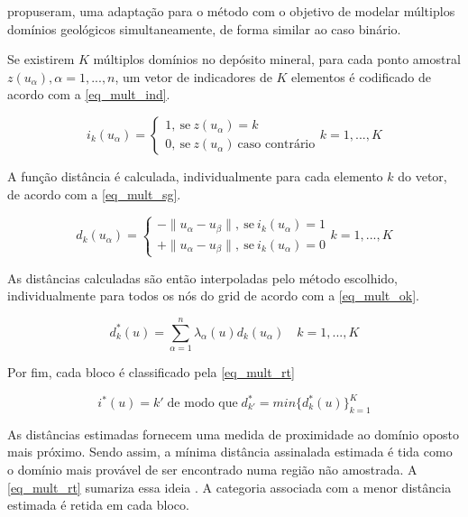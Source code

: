  propuseram, uma adaptação para o método com o objetivo de modelar múltiplos domínios geológicos simultaneamente, de forma similar ao caso binário.

Se existirem $K$ múltiplos domínios no depósito mineral, para cada ponto amostral ${z(u_\alpha),\alpha=1,...,n}$, um vetor de indicadores de $K$ elementos é codificado de acordo com a \autoref{eq_mult_ind}.

\begin{equation}
	i_k(u_\alpha)=\begin{cases}
	1,\:\textrm{se}\:z(u_\alpha)=k\\
    0,\:\textrm{se}\:z(u_\alpha)\:\textrm{caso contrário}\end{cases} k=1,...,K
    \label{eq_mult_ind}
\end{equation}

A função distância é calculada, individualmente para cada elemento $k$ do vetor, de acordo com a \autoref{eq_mult_sg}.

\begin{equation}
	d_k(u_\alpha)=\begin{cases}
	-\parallel u_\alpha-u_\beta\parallel,\:\textrm{se}\:i_k(u_\alpha)=1\\
	+\parallel u_\alpha-u_\beta\parallel,\:\textrm{se}\:i_k(u_\alpha)=0\end{cases} k=1,...,K
    \label{eq_mult_sg}
\end{equation}

As distâncias calculadas são então interpoladas pelo método escolhido, individualmente para todos os nós do grid de acordo com a \autoref{eq_mult_ok}.

\begin{equation}
	d_k^*(u)=\sum\limits_{\alpha=1}^n \lambda_\alpha(u)d_k(u_\alpha)\quad k=1,...,K
    \label{eq_mult_ok}
\end{equation}

Por fim, cada bloco é  classificado pela \autoref{eq_mult_rt}

\begin{equation}
	i^*(u)=k'\;\text{de modo que}\;d_{k'}^*=min\{d_k^*(u)\}_{k=1}^K
    \label{eq_mult_rt}
\end{equation}

As distâncias estimadas fornecem uma medida de proximidade ao domínio oposto mais próximo. Sendo assim, a mínima distância assinalada estimada é tida como o domínio mais provável de ser encontrado numa região não amostrada. A \autoref{eq_mult_rt} sumariza essa ideia \cite{silvaenhancedgeomodeling}. A categoria associada com a menor distância estimada é retida em cada bloco.

